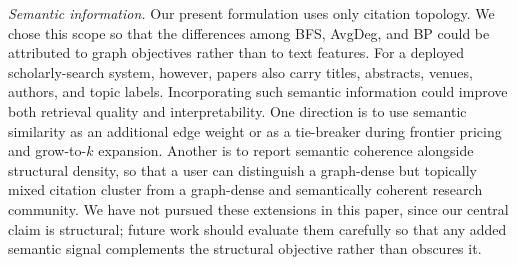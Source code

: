 \documentclass[12pt]{article}
\begin{document}
\emph{Semantic information.}  Our present formulation uses only citation topology.  We chose this scope so that the differences among BFS, AvgDeg, and BP could be attributed to graph objectives rather than to text features.  For a deployed scholarly-search system, however, papers also carry titles, abstracts, venues, authors, and topic labels.  Incorporating such semantic information could improve both retrieval quality and interpretability.  One direction is to use semantic similarity as an additional edge weight or as a tie-breaker during frontier pricing and grow-to-$k$ expansion.  Another is to report semantic coherence alongside structural density, so that a user can distinguish a graph-dense but topically mixed citation cluster from a graph-dense and semantically coherent research community.  We have not pursued these extensions in this paper, since our central claim is structural; future work should evaluate them carefully so that any added semantic signal complements the structural objective rather than obscures it.



\end{document}
